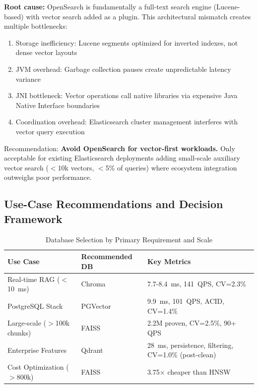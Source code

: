 \documentclass{article}
\begin{document}
\textbf{Root cause:} OpenSearch is fundamentally a full-text search engine (Lucene-based) with vector search added as a plugin. This architectural mismatch creates multiple bottlenecks:

\begin{enumerate}
    \item Storage inefficiency: Lucene segments optimized for inverted indexes, not dense vector layouts
    \item JVM overhead: Garbage collection pauses create unpredictable latency variance
    \item JNI bottleneck: Vector operations call native libraries via expensive Java Native Interface boundaries
    \item Coordination overhead: Elasticsearch cluster management interferes with vector query execution
\end{enumerate}

Recommendation: \textbf{Avoid OpenSearch for vector-first workloads.} Only acceptable for existing Elasticsearch deployments adding small-scale auxiliary vector search ($<$10k vectors, $<$5\% of queries) where ecosystem integration outweighs poor performance.

\subsection{Use-Case Recommendations and Decision Framework}
\label{sec:use_cases}

\begin{table}[h]
\small
\centering
\caption{Database Selection by Primary Requirement and Scale}
\begin{tabular}{lll}
\toprule
\textbf{Use Case} & \textbf{Recommended DB} & \textbf{Key Metrics} \\
\midrule
Real-time RAG ($<$10~ms) & Chroma & 7.7-8.4~ms, 141~QPS, CV=2.3\% \\
PostgreSQL Stack & PGVector & 9.9~ms, 101~QPS, ACID, CV=1.4\% \\
Large-scale ($>$100k chunks) & FAISS & 2.2M proven, CV=2.5\%, 90+ QPS \\
Enterprise Features & Qdrant & 28~ms, persistence, filtering, CV=1.0\% (post-clean) \\
Cost Optimization ($>$800k) & FAISS & 3.75× cheaper than HNSW \\
\bottomrule
\end{tabular}
\label{tab:usecases}
\end{table}
\end{document}
